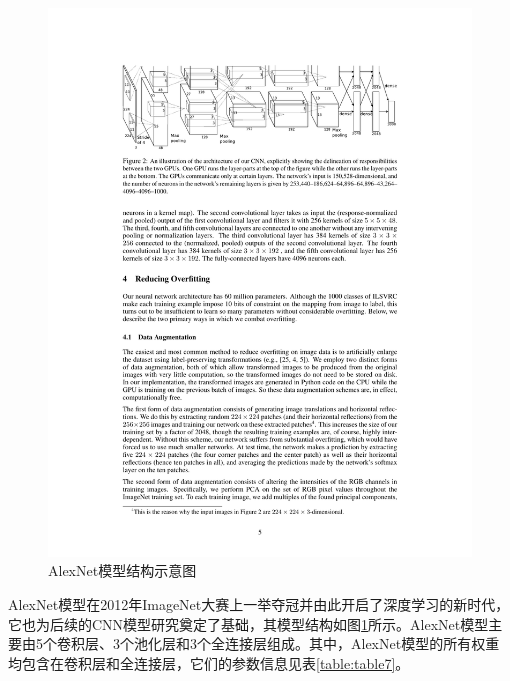 \begin{figure}[htbp]
    \centering
    \includegraphics[width=1.0\textwidth]{figures/alexnet.pdf}
    \caption{AlexNet模型结构示意图 \cite{krizhevsky2012imagenet}}\label{figure:figure17}
\end{figure}

AlexNet模型在2012年ImageNet大赛上一举夺冠并由此开启了深度学习的新时代，它也为后续的CNN模型研究奠定了基础，其模型结构如图\ref{figure:figure17}所示。AlexNet模型主要由5个卷积层、3个池化层和3个全连接层组成。其中，AlexNet模型的所有权重均包含在卷积层和全连接层，它们的参数信息见表\ref{table:table7}。

